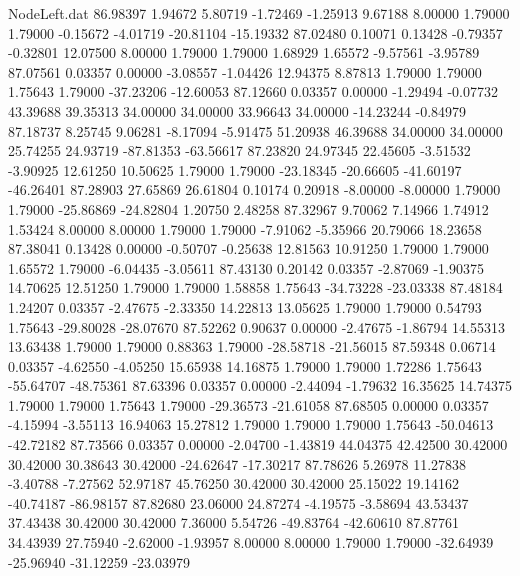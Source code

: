 \begin{filecontents}{NodeLeft.dat}
  86.98397    1.94672    5.80719    -1.72469   -1.25913    9.67188    8.00000    1.79000    1.79000   -0.15672   -4.01719  -20.81104  -15.19332
  87.02480    0.10071    0.13428    -0.79357   -0.32801   12.07500    8.00000    1.79000    1.79000    1.68929    1.65572   -9.57561   -3.95789
  87.07561    0.03357    0.00000    -3.08557   -1.04426   12.94375    8.87813    1.79000    1.79000    1.75643    1.79000  -37.23206  -12.60053
  87.12660    0.03357    0.00000    -1.29494   -0.07732   43.39688   39.35313   34.00000   34.00000   33.96643   34.00000  -14.23244   -0.84979
  87.18737    8.25745    9.06281    -8.17094   -5.91475   51.20938   46.39688   34.00000   34.00000   25.74255   24.93719  -87.81353  -63.56617
  87.23820   24.97345   22.45605    -3.51532   -3.90925   12.61250   10.50625    1.79000    1.79000  -23.18345  -20.66605  -41.60197  -46.26401
  87.28903   27.65869   26.61804     0.10174    0.20918   -8.00000   -8.00000    1.79000    1.79000  -25.86869  -24.82804    1.20750    2.48258
  87.32967    9.70062    7.14966     1.74912    1.53424    8.00000    8.00000    1.79000    1.79000   -7.91062   -5.35966   20.79066   18.23658
  87.38041    0.13428    0.00000    -0.50707   -0.25638   12.81563   10.91250    1.79000    1.79000    1.65572    1.79000   -6.04435   -3.05611
  87.43130    0.20142    0.03357    -2.87069   -1.90375   14.70625   12.51250    1.79000    1.79000    1.58858    1.75643  -34.73228  -23.03338
  87.48184    1.24207    0.03357    -2.47675   -2.33350   14.22813   13.05625    1.79000    1.79000    0.54793    1.75643  -29.80028  -28.07670
  87.52262    0.90637    0.00000    -2.47675   -1.86794   14.55313   13.63438    1.79000    1.79000    0.88363    1.79000  -28.58718  -21.56015
  87.59348    0.06714    0.03357    -4.62550   -4.05250   15.65938   14.16875    1.79000    1.79000    1.72286    1.75643  -55.64707  -48.75361
  87.63396    0.03357    0.00000    -2.44094   -1.79632   16.35625   14.74375    1.79000    1.79000    1.75643    1.79000  -29.36573  -21.61058
  87.68505    0.00000    0.03357    -4.15994   -3.55113   16.94063   15.27812    1.79000    1.79000    1.79000    1.75643  -50.04613  -42.72182
  87.73566    0.03357    0.00000    -2.04700   -1.43819   44.04375   42.42500   30.42000   30.42000   30.38643   30.42000  -24.62647  -17.30217
  87.78626    5.26978   11.27838    -3.40788   -7.27562   52.97187   45.76250   30.42000   30.42000   25.15022   19.14162  -40.74187  -86.98157
  87.82680   23.06000   24.87274    -4.19575   -3.58694   43.53437   37.43438   30.42000   30.42000    7.36000    5.54726  -49.83764  -42.60610
  87.87761   34.43939   27.75940    -2.62000   -1.93957    8.00000    8.00000    1.79000    1.79000  -32.64939  -25.96940  -31.12259  -23.03979

\end{filecontents}

